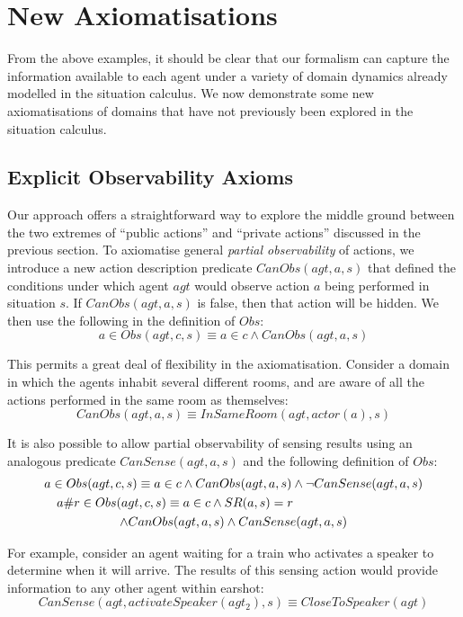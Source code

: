 \section{New Axiomatisations\label{sec:Observations:Axiomatising-extended}}

From the above examples, it should be clear that our formalism can
capture the information available to each agent under a variety of
domain dynamics already modelled in the situation calculus. We now
demonstrate some new axiomatisations of domains that have not previously
been explored in the situation calculus.


\subsection{Explicit Observability Axioms}

Our approach offers a straightforward way to explore the middle ground
between the two extremes of {}``public actions'' and {}``private
actions'' discussed in the previous section. To axiomatise general
\emph{partial observability} of actions, we introduce a new action
description predicate $CanObs(agt,a,s)$ that defined the conditions
under which agent $agt$ would observe action $a$ being performed
in situation $s$. If $CanObs(agt,a,s)$ is false, then that action
will be hidden. We then use the following in the definition of $Obs$:\[
a\in Obs(agt,c,s)\equiv a\in c\wedge CanObs(agt,a,s)\]


This permits a great deal of flexibility in the axiomatisation. Consider
a domain in which the agents inhabit several different rooms, and
are aware of all the actions performed in the same room as themselves:\[
CanObs(agt,a,s)\equiv InSameRoom(agt,actor(a),s)\]


It is also possible to allow partial observability of sensing results
using an analogous predicate $CanSense(agt,a,s)$ and the following
definition of $Obs$:\begin{multline*}
a\in Obs(agt,c,s)\equiv a\in c\wedge CanObs(agt,a,s)\wedge\neg CanSense(agt,a,s)\\
\shoveleft{a\#r\in Obs(agt,c,s)\equiv a\in c\wedge SR(a,s)=r}\\
\wedge CanObs(agt,a,s)\wedge CanSense(agt,a,s)\end{multline*}


For example, consider an agent waiting for a train who activates a
speaker to determine when it will arrive. The results of this sensing
action would provide information to any other agent within earshot:\[
CanSense(agt,activateSpeaker(agt_{2}),s)\equiv CloseToSpeaker(agt)\]


